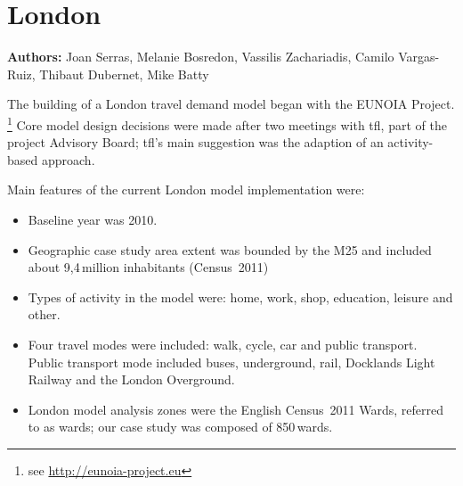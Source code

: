 \chapter{London}
\label{ch:london}
\hfill \textbf{Authors:} Joan Serras, Melanie Bosredon, Vassilis Zachariadis, Camilo Vargas-Ruiz, Thibaut Dubernet, Mike Batty


The building of a London travel demand model began with the EUNOIA Project.
\footnote{see \url{http://eunoia-project.eu}} 
Core model design decisions were made after two meetings with \gls{tfl}, part of the project Advisory Board; 
\gls{tfl}'s main suggestion was the adaption of an activity-based approach.

Main features of the current London model implementation were:
%
\begin{itemize}\styleItemize
\item     Baseline year was 2010.
\item	Geographic case study area extent was bounded by the M25 and included about 9,4\,million inhabitants (Census~2011)
\item	Types of activity in the model were: home, work, shop, education, leisure and other.
\item	Four travel modes were included: walk, cycle, car and public transport. Public transport mode included buses, underground, rail, Docklands Light Railway and the London Overground.
\item	 London model analysis zones were the English Census~2011 Wards, referred to as wards; our case study was composed of 850\,wards.
\end{itemize}
%
